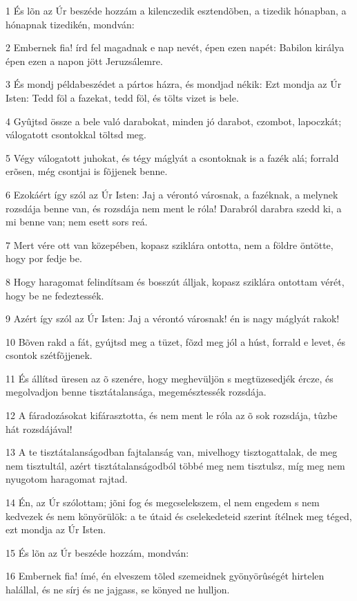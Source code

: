\par 1 És lõn az Úr beszéde hozzám a kilenczedik esztendõben, a tizedik hónapban, a hónapnak tizedikén, mondván:
\par 2 Embernek fia! írd fel magadnak e nap nevét, épen ezen napét: Babilon királya épen ezen a napon jött Jeruzsálemre.
\par 3 És mondj példabeszédet a pártos házra, és mondjad nékik: Ezt mondja az Úr Isten: Tedd föl a fazekat, tedd föl, és tölts vizet is bele.
\par 4 Gyûjtsd össze a bele való darabokat, minden jó darabot, czombot, lapoczkát; válogatott csontokkal töltsd meg.
\par 5 Végy válogatott juhokat, és tégy máglyát a csontoknak is a fazék alá; forrald erõsen, még csontjai is fõjjenek benne.
\par 6 Ezokáért így szól az Úr Isten: Jaj a vérontó városnak, a fazéknak, a melynek rozsdája benne van, és rozsdája nem ment le róla! Darabról darabra szedd ki, a mi benne van; nem esett sors reá.
\par 7 Mert vére ott van közepében, kopasz sziklára ontotta, nem a földre öntötte, hogy por fedje be.
\par 8 Hogy haragomat felindítsam és bosszút álljak, kopasz sziklára ontottam vérét, hogy be ne fedeztessék.
\par 9 Azért így szól az Úr Isten: Jaj a vérontó városnak! én is nagy máglyát rakok!
\par 10 Bõven rakd a fát, gyújtsd meg a tüzet, fõzd meg jól a húst, forrald e levet, és csontok szétfõjjenek.
\par 11 És állítsd üresen az õ szenére, hogy meghevüljön s megtüzesedjék ércze, és megolvadjon benne tisztátalansága, megemésztessék rozsdája.
\par 12 A fáradozásokat kifárasztotta, és nem ment le róla az õ sok rozsdája, tûzbe hát rozsdájával!
\par 13 A te tisztátalanságodban fajtalanság van, mivelhogy tisztogattalak, de meg nem tisztultál, azért tisztátalanságodból többé meg nem tisztulsz, míg meg nem nyugotom haragomat rajtad.
\par 14 Én, az Úr szólottam; jõni fog és megcselekszem, el nem engedem s nem kedvezek és nem könyörülök: a te útaid és cselekedeteid szerint ítélnek meg téged, ezt mondja az Úr Isten.
\par 15 És lõn az Úr beszéde hozzám, mondván:
\par 16 Embernek fia! ímé, én elveszem tõled szemeidnek gyönyörûségét hirtelen halállal, és ne sírj és ne jajgass, se könyed ne hulljon.
